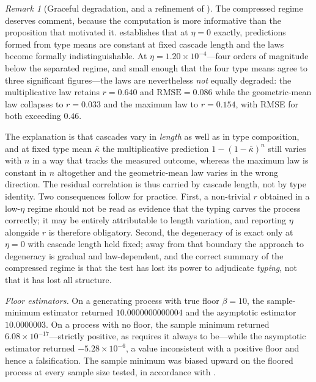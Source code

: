 \documentclass[11pt,a4paper]{article}
\theoremstyle{thmstyle}
\theoremstyle{definition}
\theoremstyle{remark}
\newtheorem{remark}[theorem]{Remark}
\newcommand{\flo}{\beta}
\newcommand{\kap}{\kappa}
\begin{document}
\begin{remark}[Graceful degradation, and a refinement of
]
\label{rem:graceful}
The compressed regime deserves comment, because the computation is more
informative than the proposition that motivated it. 
establishes that at $\eta=0$ exactly, predictions formed from type means are
constant at fixed cascade length and the laws become formally
indistinguishable. At $\eta=1.20\times10^{-4}$---four orders of magnitude
below the separated regime, and small enough that the four type means agree
to three significant figures---the laws are nevertheless \emph{not}
equally degraded: the multiplicative law retains $r=0.640$ and
$\mathrm{RMSE}=0.086$ while the geometric-mean law collapses to $r=0.033$
and the maximum law to $r=0.154$, with RMSE for both exceeding $0.46$.

The explanation is that cascades vary in \emph{length} as well as in type
composition, and at fixed type mean $\bar\kap$ the multiplicative prediction
$1-(1-\bar\kap)^n$ still varies with $n$ in a way that tracks the measured
outcome, whereas the maximum law is constant in $n$ altogether and the
geometric-mean law varies in the wrong direction. The residual correlation is
thus carried by cascade length, not by type identity. Two consequences follow
for practice. First, a non-trivial $r$ obtained in a low-$\eta$ regime should
not be read as evidence that the typing carves the process correctly; it may
be entirely attributable to length variation, and reporting $\eta$ alongside
$r$ is therefore obligatory. Second, the degeneracy of
 is exact only at $\eta=0$ with cascade length held
fixed; away from that boundary the approach to degeneracy is gradual and
law-dependent, and the correct summary of the compressed regime is that the
test has lost its power to adjudicate \emph{typing}, not that it has lost all
structure.
\end{remark}

\emph{Floor estimators.} On a generating process with true floor
$\flo=10$, the sample-minimum estimator returned $10.0000000000004$ and the
asymptotic estimator $10.0000003$. On a process with no floor, the
sample minimum returned $6.08\times10^{-17}$---strictly positive, as
 requires it always to be---while the asymptotic
estimator returned $-5.28\times10^{-6}$, a value inconsistent with a positive
floor and hence a falsification. The sample minimum was biased upward on the
floored process at every sample size tested, in accordance with
.
\end{document}
